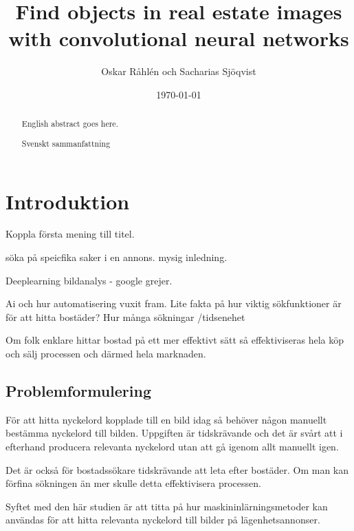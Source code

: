 \documentclass{kththesis}
\title{Find objects in real estate images with convolutional neural networks}
\author{Oskar Råhlén och Sacharias Sjöqvist}
\date{\today}
\begin{document}
\frontmatter

\titlepage

\begin{abstract}
  English abstract goes here.
\end{abstract}

\begin{otherlanguage}{swedish}
  \begin{abstract}
    Svenskt sammanfattning
  \end{abstract}
\end{otherlanguage}

\tableofcontents

\mainmatter


\chapter{Introduktion}

Koppla första mening till titel.

söka på speicfika saker i en annons.
mysig inledning.

Deeplearning bildanalys - google grejer.

Ai och hur automatisering vuxit fram. 
Lite fakta på hur viktig sökfunktioner är för att hitta bostäder? Hur många sökningar /tidsenehet

Om folk enklare hittar bostad på ett mer effektivt sätt så effektiviseras hela köp och sälj processen och därmed hela marknaden.


  \section{Problemformulering}
  För att hitta nyckelord kopplade till en bild idag så behöver någon manuellt bestämma nyckelord till bilden. Uppgiften är tidskrävande och det är svårt att i efterhand producera relevanta nyckelord utan att gå igenom allt manuellt igen. 

  Det är också för bostadssökare tidskrävande att leta efter bostäder. Om man kan förfina sökningen än mer skulle detta effektivisera processen.

  Syftet med den här studien är att titta på hur maskininlärningsmetoder kan användas för att hitta relevanta nyckelord till bilder på lägenhetsannonser. 
\end{document}
